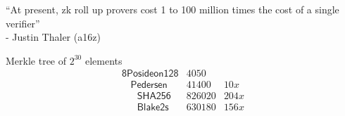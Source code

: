 \documentclass{beamer}
\begin{document}
\begin{frame}


``At present, zk roll up provers  cost 1 to 100 million times the cost of a single verifier'' \\ \smallskip
- Justin Thaler (a16z)

\bigskip\bigskip\bigskip

Merkle tree of $2^{30}$ elements \\

$$ \begin{matrix}
\mathsf{8Posideon128} & 4050 & \\
\mathsf{\ \ \ \ Pedersen} & 41400 & 10x \\
\mathsf{\ \ \ \ \ \ \ SHA256} & 826020 & 204x \\
\mathsf{\ \ \ \ \ \ \ Blake2s} & 630180 & 156x \\
\end{matrix} $$

\end{frame}
\end{document}
